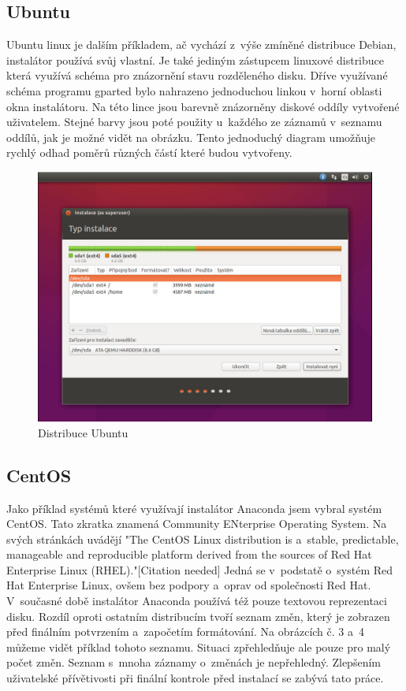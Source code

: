 \documentclass{report}
\begin{document}
\subsection{Ubuntu}

Ubuntu linux je dalším příkladem, ač vychází z~výše zmíněné distribuce Debian, instalátor používá svůj vlastní. Je také jediným zástupcem linuxové distribuce která využívá  schéma 
pro znázornění stavu rozděleného disku. Dříve využívané schéma programu gparted bylo nahrazeno jednoduchou linkou v~horní oblasti okna instalátoru. Na této lince jsou barevně znázorněny diskové 
oddíly vytvořené uživatelem. Stejné barvy jsou poté použity u~každého ze záznamů v~seznamu oddílů, jak je možné vidět na obrázku. Tento jednoduchý diagram umožňuje rychlý odhad poměrů různých 
částí které budou vytvořeny.

\begin{figure}[hb]
\label{fig:ubuntu}
\caption{Distribuce Ubuntu}
\centering
\includegraphics[width=.8\columnwidth]{pics/ubuntu1.jpg}
\end{figure}

\subsection{CentOS}

Jako příklad systémů které využívají instalátor Anaconda jsem vybral systém CentOS. Tato zkratka znamená Community ENterprise Operating System. Na svých stránkách uvádějí "The CentOS Linux
distribution is a~stable, predictable, manageable and reproducible platform derived from the sources of Red Hat Enterprise Linux (RHEL)."[Citation needed] Jedná se v~podstatě o~systém Red Hat Enterprise 
Linux, ovšem bez podpory a~oprav od společnosti Red Hat. V~současné době instalátor Anaconda používá též pouze textovou reprezentaci disku. Rozdíl oproti ostatním distribucím tvoří 
seznam změn, který je zobrazen před finálním potvrzením a~započetím formátování. Na obrázcích č. 3 a~4 můžeme vidět příklad tohoto seznamu. Situaci zpřehledňuje ale pouze pro malý počet změn. Seznam s~mnoha 
záznamy o~změnách je nepřehledný. Zlepšením uživatelské přívětivosti při finální kontrole před instalací se zabývá tato práce.
\end{document}
